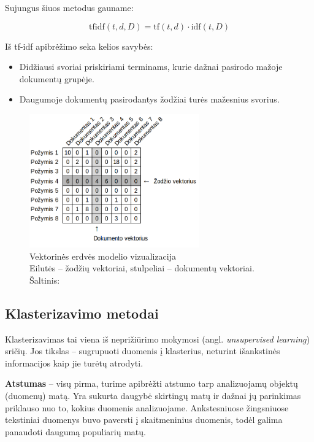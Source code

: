 \documentclass{VUMIFInfBakalaurinis}
\begin{document}
Sujungus šiuos metodus gauname:

$${\displaystyle \mathrm {tfidf} (t,d,D)=\mathrm {tf} (t,d)\cdot \mathrm {idf} (t,D)}$$

Iš tf-idf apibrėžimo seka kelios savybės:

\begin{itemize}
\item
  Didžiausi svoriai priskiriami terminams, kurie dažnai pasirodo mažoje
  dokumentų grupėje.
\item
  Daugumoje dokumentų pasirodantys žodžiai turės mažesnius svorius.
\end{itemize}

\begin{figure}[H]
	\centering
	\includegraphics[width=0.65\textwidth]{./img/image25.png}
  \caption{Vektorinės erdvės modelio vizualizacija\\
  Eilutės -- žodžių vektoriai, stulpeliai -- dokumentų vektoriai.\\
  Šaltinis: \cite{marksberry2014employee}}
\end{figure}

\subsection{Klasterizavimo metodai}\label{clustering}

Klasterizavimas tai viena iš neprižiūrimo mokymosi (angl.
\emph{unsupervised learning}) sričių. Jos tikslas -- sugrupuoti duomenis
į klasterius, neturint išankstinės informacijos kaip jie turėtų
atrodyti.

\textbf{Atstumas} -- visų pirma, turime apibrėžti atstumo tarp
  analizuojamų objektų (duomenų) matą. Yra sukurta daugybė skirtingų
  matų ir dažnai jų parinkimas priklauso nuo to, kokius duomenis
  analizuojame. Ankstesniuose žingsniuose tekstiniai duomenys buvo
  paversti į skaitmeninius duomenis, todėl galima panaudoti daugumą
  populiarių matų.
\end{document}

